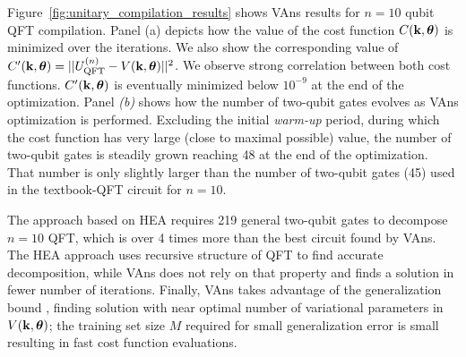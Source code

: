 Figure~\ref{fig:unitary_compilation_results} shows VAns results for $n=10$ qubit QFT compilation. Panel (a) depicts how the value of the cost function $C(\mathbf{k},\bm{\theta})$ is minimized over the iterations. We also show the corresponding value of $C'(\mathbf{k},\bm{\theta}) = || U_\mathrm{QFT}^{(n)} - V(\mathbf{k},\bm{\theta})||^2$.
We observe strong correlation between both cost functions. $C'(\mathbf{k},\bm{\theta})$ is eventually minimized below $10^{-9}$ at the end of the optimization. Panel \textit{(b)} shows how the number of two-qubit gates evolves as VAns optimization is performed. Excluding the initial \textit{warm-up} period, during which the cost function has very large (close to maximal possible) value, the number of two-qubit gates %
is steadily grown reaching 48 at the end of the optimization.
That number is only slightly larger than the number of two-qubit gates (45) used in the textbook-QFT circuit for $n=10$.

The approach based on HEA requires 219 general two-qubit gates to decompose $n=10$ QFT, which is over 4 times more than the best circuit found by VAns. The HEA approach uses recursive structure of QFT to find accurate decomposition, while VAns does not rely on that property and finds a solution in fewer number of iterations. Finally, VAns takes advantage of the generalization bound \cite{caro2021generalization}, finding solution with near optimal number of variational parameters in $V(\mathbf{k},\bm{\theta})$; the training set size $M$ required for small generalization error is small resulting in fast cost function evaluations.
\afterpage{\clearpage}
